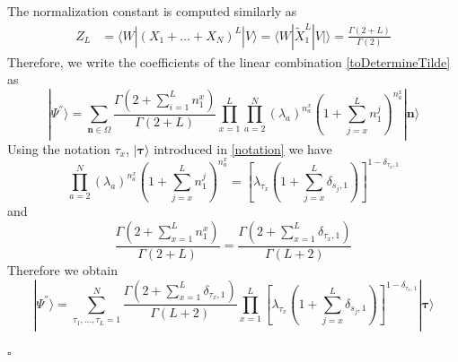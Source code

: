 \documentclass[11pt]{article}
\numberwithin{equation}{section}
\numberwithin{equation}{subsection}
\begin{document}
The normalization constant is computed similarly as 
\begin{align*}
	Z_{L}&=\langle W|(X_{1}+\ldots+X_{N})^{L}|V\rangle=\langle W|\widetilde{X}_{1}^{L}|V|\rangle=
	\frac{\Gamma(2+L)}{\Gamma(2)}
\end{align*}
Therefore, we write the coefficients of the linear combination \eqref{toDetermineTilde} as 
\begin{equation}\label{resulEsteady}
	|\Psi^{''}\rangle= \sum_{\bm{n}\in \Omega}\frac{\Gamma(2+\sum_{i=1}^{L}n_{1}^{x})}{\Gamma(2+L)}\prod_{x=1}^{L}\prod_{a=2}^{N}\left(\lambda_{a}\right)^{n_{a}^{x}}\left(1+\sum_{j=x}^{L}n_{1}^{j}\right)^{n_{a}^{x}}|\bm{n}\rangle
\end{equation}
Using the notation $\tau_{x}$, $|\bm{\tau}\rangle $ introduced in \eqref{notation} we have 
\begin{equation}
	\prod_{a=2}^{N}\left(\lambda_{a}\right)^{n_{a}^{x}}\left(1+\sum_{j=x}^{L}n_{1}^{j}\right)^{n_{a}^{x}}=\left[\lambda_{\tau_{x}}\left(1+\sum_{j=x}^{L}\delta_{s_{j},1}\right)\right]^{1-\delta_{\tau_{x},1}}
\end{equation}
and 
\begin{equation}
	\frac{\Gamma(2+\sum_{x=1}^{L}n_{1}^{x})}{\Gamma(2+L)}=\frac{\Gamma\left(2+\sum_{x=1}^{L}\delta_{\tau_{x},1}\right)}{\Gamma\left(L+2\right)}
\end{equation}
Therefore we obtain
\begin{equation}
|\Psi^{''}\rangle=\sum_{\tau_{1},\ldots,\tau_{L}=1}^{N}\frac{\Gamma\left(2+\sum_{x=1}^{L}\delta_{\tau_{x},1}\right)}{\Gamma\left(L+2\right)}\prod_{x=1}^{L}\left[\lambda_{\tau_{x}}\left(1+\sum_{j=x}^{L}\delta_{s_{j},1}\right)\right]^{1-\delta_{\tau_{x},1}}|\mathbf{\bm{\tau}}\rangle
\end{equation}
\begin{flushright}
$\square$
\end{flushright}
\end{document}
